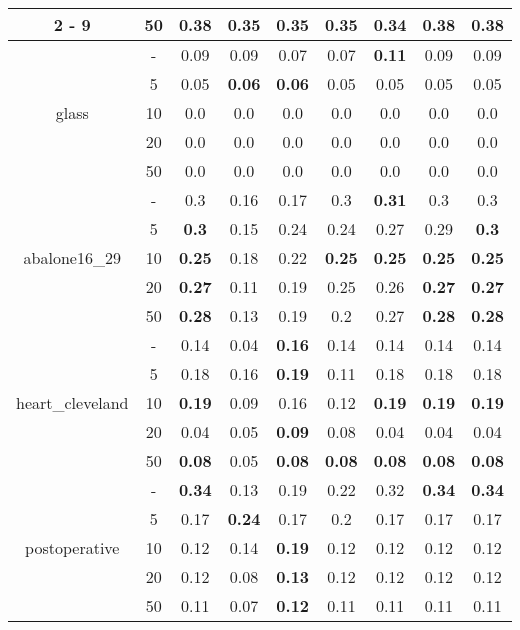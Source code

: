 \documentclass{article}%
\begin{document}
\begin{tabular}{c|c|ccccccc}
\cline{2%
-%
9}%
&50&\textbf{0.38}&0.35&0.35&0.35&0.34&\textbf{0.38}&\textbf{0.38}\\%
\hline%
\multirow{5}{*}{glass}&{-}&0.09&0.09&0.07&0.07&\textbf{0.11}&0.09&0.09\\%
\cline{2%
-%
9}%
&5&0.05&\textbf{0.06}&\textbf{0.06}&0.05&0.05&0.05&0.05\\%
\cline{2%
-%
9}%
&10&0.0&0.0&0.0&0.0&0.0&0.0&0.0\\%
\cline{2%
-%
9}%
&20&0.0&0.0&0.0&0.0&0.0&0.0&0.0\\%
\cline{2%
-%
9}%
&50&0.0&0.0&0.0&0.0&0.0&0.0&0.0\\%
\hline%
\multirow{5}{*}{abalone16\_29}&{-}&0.3&0.16&0.17&0.3&\textbf{0.31}&0.3&0.3\\%
\cline{2%
-%
9}%
&5&\textbf{0.3}&0.15&0.24&0.24&0.27&0.29&\textbf{0.3}\\%
\cline{2%
-%
9}%
&10&\textbf{0.25}&0.18&0.22&\textbf{0.25}&\textbf{0.25}&\textbf{0.25}&\textbf{0.25}\\%
\cline{2%
-%
9}%
&20&\textbf{0.27}&0.11&0.19&0.25&0.26&\textbf{0.27}&\textbf{0.27}\\%
\cline{2%
-%
9}%
&50&\textbf{0.28}&0.13&0.19&0.2&0.27&\textbf{0.28}&\textbf{0.28}\\%
\hline%
\multirow{5}{*}{heart\_cleveland}&{-}&0.14&0.04&\textbf{0.16}&0.14&0.14&0.14&0.14\\%
\cline{2%
-%
9}%
&5&0.18&0.16&\textbf{0.19}&0.11&0.18&0.18&0.18\\%
\cline{2%
-%
9}%
&10&\textbf{0.19}&0.09&0.16&0.12&\textbf{0.19}&\textbf{0.19}&\textbf{0.19}\\%
\cline{2%
-%
9}%
&20&0.04&0.05&\textbf{0.09}&0.08&0.04&0.04&0.04\\%
\cline{2%
-%
9}%
&50&\textbf{0.08}&0.05&\textbf{0.08}&\textbf{0.08}&\textbf{0.08}&\textbf{0.08}&\textbf{0.08}\\%
\hline%
\multirow{5}{*}{postoperative}&{-}&\textbf{0.34}&0.13&0.19&0.22&0.32&\textbf{0.34}&\textbf{0.34}\\%
\cline{2%
-%
9}%
&5&0.17&\textbf{0.24}&0.17&0.2&0.17&0.17&0.17\\%
\cline{2%
-%
9}%
&10&0.12&0.14&\textbf{0.19}&0.12&0.12&0.12&0.12\\%
\cline{2%
-%
9}%
&20&0.12&0.08&\textbf{0.13}&0.12&0.12&0.12&0.12\\%
\cline{2%
-%
9}%
&50&0.11&0.07&\textbf{0.12}&0.11&0.11&0.11&0.11\\%
\hline%
\end{tabular}

%
\end{document}
